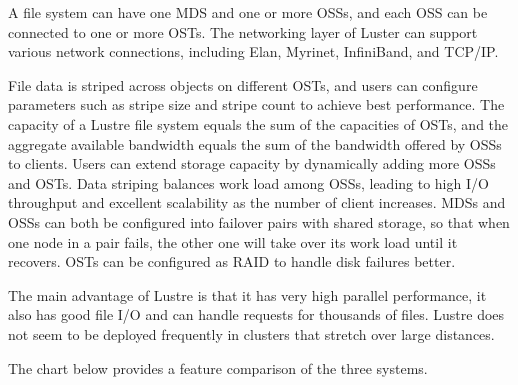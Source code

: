 \documentclass[11pt]{article}
\begin{document}
A file system can have one MDS and one or more OSSs, and each OSS can 
be connected to one or more OSTs. The networking layer of Luster can 
support various network connections, including Elan, Myrinet, InfiniBand, 
and TCP/IP.

File data is striped across objects on different OSTs, and users can 
configure parameters such as stripe size and stripe count to achieve 
best performance. The capacity of a Lustre file system equals the sum 
of the capacities of OSTs, and the aggregate available bandwidth equals 
the sum of the bandwidth offered by OSSs to clients. Users can extend 
storage capacity by dynamically adding more OSSs and OSTs. Data striping 
balances work load among OSSs, leading to high I/O throughput and 
excellent scalability as the number of client increases. MDSs and OSSs 
can both be configured into failover pairs with shared storage, so that 
when one node in a pair fails, the other one will take over its work load 
until it recovers. OSTs can be configured as RAID to handle disk failures 
better.

The main advantage of Lustre is that it has very high parallel 
performance, it also has good file I/O and can handle requests for 
thousands of files. Lustre does not seem to be deployed frequently 
in clusters that stretch over large distances.

The chart below provides a feature comparison of the three systems.
\end{document}
